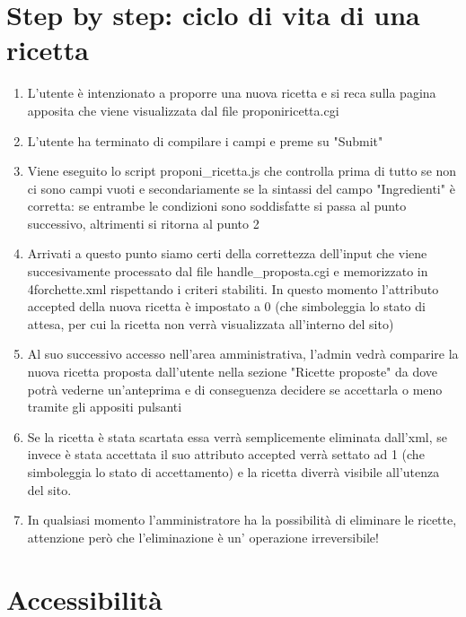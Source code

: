 \documentclass[12pt]{article}
\begin{document}
	\section{Step by step: ciclo di vita di una ricetta}
			
\begin{enumerate}
\item L'utente \`e intenzionato a proporre una nuova ricetta e si reca sulla pagina apposita che viene visualizzata dal file proponiricetta.cgi
\item L'utente ha terminato di compilare i campi e preme su "Submit"
\item Viene eseguito lo script proponi\_ricetta.js che controlla prima di tutto se non ci sono campi vuoti e secondariamente se la sintassi del campo "Ingredienti" \`e corretta: se entrambe le condizioni sono soddisfatte si passa al punto successivo, altrimenti si ritorna al punto 2
\item Arrivati a questo punto siamo certi della correttezza dell'input che viene succesivamente processato dal file handle\_proposta.cgi e memorizzato in 4forchette.xml rispettando i criteri stabiliti. In questo momento l'attributo accepted della nuova ricetta \`e impostato a 0 (che simboleggia lo stato di attesa, per cui la ricetta non verr\`a visualizzata all'interno del sito)
\item Al suo successivo accesso nell'area amministrativa, l'admin vedr\`a comparire la nuova ricetta proposta dall'utente nella sezione "Ricette proposte" da dove potr\`a  vederne un'anteprima e di conseguenza decidere se accettarla o meno tramite gli appositi pulsanti
\item Se la ricetta \`e stata scartata essa verr\`a semplicemente eliminata dall'xml, se invece \`e stata accettata il suo attributo accepted verr\`a settato ad 1 (che simboleggia lo stato di accettamento) e la ricetta diverr\`a visibile all'utenza del sito.
\item In qualsiasi momento l'amministratore ha la possibilità di eliminare le ricette, attenzione per\`o che l'eliminazione \`e un' operazione irreversibile!
\end{enumerate}
\newpage

	\newpage
		\section{Accessibilit\`a}
\end{document}

